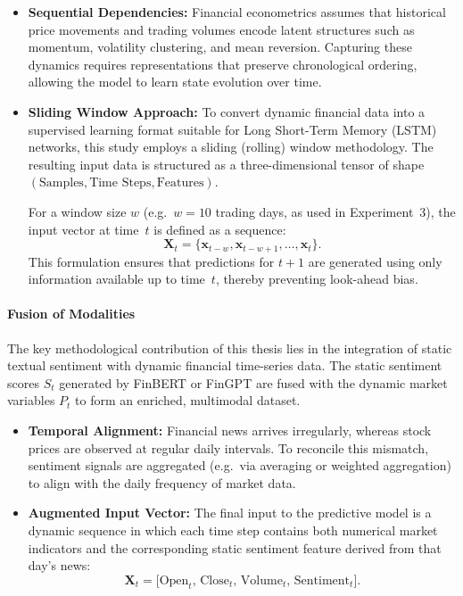 \documentclass[12pt]{ucetd}
\begin{document}
\begin{itemize}
    \item \textbf{Sequential Dependencies:}
    Financial econometrics assumes that historical price movements and trading volumes encode latent structures such as momentum, volatility clustering, and mean reversion. Capturing these dynamics requires representations that preserve chronological ordering, allowing the model to learn state evolution over time.

    \item \textbf{Sliding Window Approach:}
    To convert dynamic financial data into a supervised learning format suitable for Long Short-Term Memory (LSTM) networks, this study employs a sliding (rolling) window methodology. The resulting input data is structured as a three-dimensional tensor of shape $(\text{Samples}, \text{Time Steps}, \text{Features})$.

    For a window size $w$ (e.g.\ $w=10$ trading days, as used in Experiment~3), the input vector at time~$t$ is defined as a sequence:
    \[
        \mathbf{X}_t = \{ \mathbf{x}_{t-w}, \mathbf{x}_{t-w+1}, \dots, \mathbf{x}_{t} \}.
    \]
    This formulation ensures that predictions for $t+1$ are generated using only information available up to time~$t$, thereby preventing look-ahead bias.
\end{itemize}

\paragraph{Fusion of Modalities}

The key methodological contribution of this thesis lies in the integration of static textual sentiment with dynamic financial time-series data. The static sentiment scores $S_t$ generated by FinBERT or FinGPT are fused with the dynamic market variables $P_t$ to form an enriched, multimodal dataset.

\begin{itemize}
    \item \textbf{Temporal Alignment:}
    Financial news arrives irregularly, whereas stock prices are observed at regular daily intervals. To reconcile this mismatch, sentiment signals are aggregated (e.g.\ via averaging or weighted aggregation) to align with the daily frequency of market data.

    \item \textbf{Augmented Input Vector:}
    The final input to the predictive model is a dynamic sequence in which each time step contains both numerical market indicators and the corresponding static sentiment feature derived from that day's news:
    \[
        \mathbf{X}_t =
        \big[
        \text{Open}_t,\,
        \text{Close}_t,\,
        \text{Volume}_t,\,
        \text{Sentiment}_t
        \big].
    \]
\end{itemize}
\end{document}
